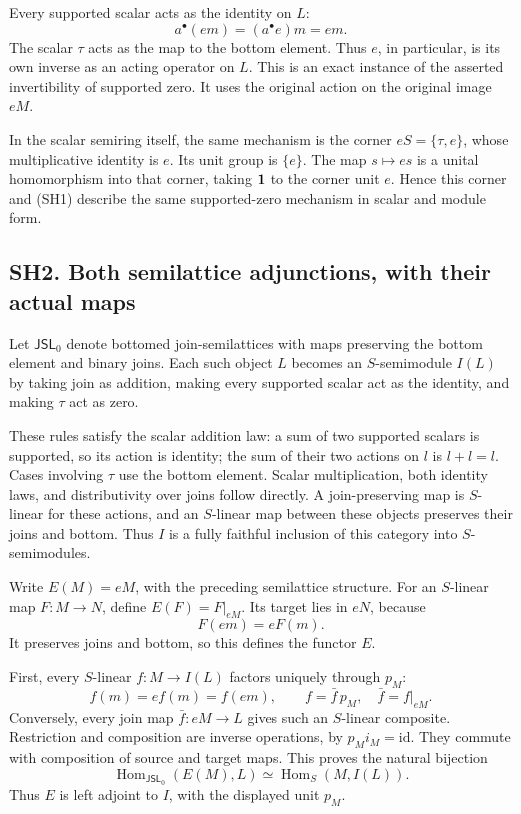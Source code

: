 \documentclass[
]{article}
\begin{document}
Every supported scalar acts as the identity on \(L\): \[
a^\bullet(em)=(a^\bullet e)m=em.
\tag{SH3}
\] The scalar \(\tau\) acts as the map to the bottom element. Thus
\(e\), in particular, is its own inverse as an acting operator on \(L\).
This is an exact instance of the asserted invertibility of supported
zero. It uses the original action on the original image \(eM\).

In the scalar semiring itself, the same mechanism is the corner
\(eS=\{\tau,e\}\), whose multiplicative identity is \(e\). Its unit
group is \(\{e\}\). The map \(s\mapsto es\) is a unital homomorphism
into that corner, taking \({\bf1}\) to the corner unit \(e\). Hence this
corner and (SH1) describe the same supported-zero mechanism in scalar
and module form.

\subsection{SH2. Both semilattice adjunctions, with their actual
maps}\label{sh2.-both-semilattice-adjunctions-with-their-actual-maps}

Let \(\mathsf{JSL}_0\) denote bottomed join-semilattices with maps
preserving the bottom element and binary joins. Each such object \(L\)
becomes an \(S\)-semimodule \(I(L)\) by taking join as addition, making
every supported scalar act as the identity, and making \(\tau\) act as
zero.

These rules satisfy the scalar addition law: a sum of two supported
scalars is supported, so its action is identity; the sum of their two
actions on \(l\) is \(l+l=l\). Cases involving \(\tau\) use the bottom
element. Scalar multiplication, both identity laws, and distributivity
over joins follow directly. A join-preserving map is \(S\)-linear for
these actions, and an \(S\)-linear map between these objects preserves
their joins and bottom. Thus \(I\) is a fully faithful inclusion of this
category into \(S\)-semimodules.

Write \(E(M)=eM\), with the preceding semilattice structure. For an
\(S\)-linear map \(F:M\to N\), define \(E(F)=F|_{eM}\). Its target lies
in \(eN\), because \[
F(em)=eF(m).
\tag{SH4}
\] It preserves joins and bottom, so this defines the functor \(E\).

First, every \(S\)-linear \(f:M\to I(L)\) factors uniquely through
\(p_M\): \[
f(m)=ef(m)=f(em),\qquad
f=\bar f\,p_M,\quad \bar f=f|_{eM}.
\tag{SH5}
\] Conversely, every join map \(\bar f:eM\to L\) gives such an
\(S\)-linear composite. Restriction and composition are inverse
operations, by \(p_Mi_M=\mathrm{id}\). They commute with composition of
source and target maps. This proves the natural bijection \[
\operatorname{Hom}_{\mathsf{JSL}_0}(E(M),L)
\simeq \operatorname{Hom}_S(M,I(L)).
\tag{SH6}
\] Thus \(E\) is left adjoint to \(I\), with the displayed unit \(p_M\).
\end{document}
